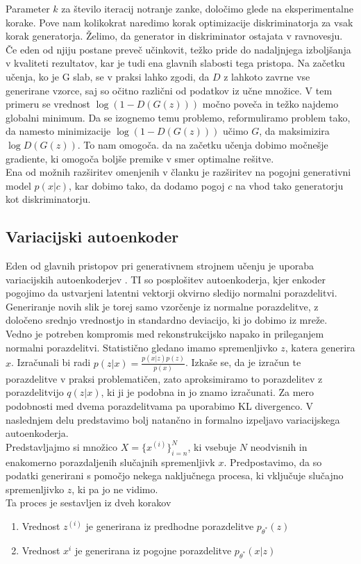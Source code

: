 \documentclass[12pt,a4paper,twoside]{article}
\theoremstyle{definition} %
\theoremstyle{plain} %
\numberwithin{equation}{section}  %
\begin{document}
Parameter $k$ za število iteracij notranje zanke, določimo glede na eksperimentalne korake. Pove nam kolikokrat naredimo korak optimizacije diskriminatorja za vsak korak generatorja. 
Želimo, da generator in diskriminator ostajata v ravnovesju. Če eden od njiju postane preveč učinkovit, težko pride do nadaljnjega izboljšanja v kvaliteti rezultatov, kar je tudi ena glavnih slabosti tega pristopa.  
Na začetku učenja, ko je G slab, se v praksi lahko zgodi, da $D$ z lahkoto zavrne vse generirane vzorce, saj so očitno različni od podatkov iz učne množice. V tem primeru se vrednost $\log(1-D(G(z)))$ močno poveča in težko najdemo globalni minimum. Da se izognemo temu problemo, reformuliramo problem tako, da namesto minimizacije  $\log(1-D(G(z)))$ učimo $G$, da maksimizira $\log{D(G(z))}$. To nam omogoča. da na začetku učenja dobimo močnešje gradiente, ki omogoča boljše premike v smer optimalne rešitve. 
\\
Ena od možnih razširitev omenjenih v članku je razširitev na pogojni generativni model $p(x | c)$, kar  dobimo tako, da dodamo pogoj $c$ na vhod tako generatorju kot diskriminatorju.  

\subsection{Variacijski autoenkoder}
Eden od glavnih pristopov pri generativnem strojnem učenju je uporaba variacijskih autoenkoderjev \cite{kingma2013auto}.  TI so posplošitev autoenkoderja, kjer  enkoder pogojimo da ustvarjeni latentni vektorji okvirno sledijo normalni porazdelitvi. Generiranje novih slik je torej samo vzorčenje iz  normalne porazdelitve,
z določeno srednjo vrednostjo in standardno deviacijo, ki jo dobimo iz mreže. Vedno je potreben kompromis med rekonstrukcijsko napako in prileganjem normalni porazdelitvi. 
Statistično gledano imamo spremenljivko $z$, katera generira $x$. Izračunali bi radi $p(z|x) = \frac{p(x|z)p(z)}{p(x)}$. Izkaše se, da je izračun te porazdelitve v praksi problematičen, zato aproksimiramo to porazdelitev z porazdelitvijo $q(z|x)$, ki ji je podobna in jo znamo izračunati. Za mero podobnosti med dvema porazdelitvama pa uporabimo KL divergenco. 
V naslednjem delu predstavimo bolj natančno in formalno izpeljavo variacijskega autoenkoderja. 
 \\
Predstavljajmo si množico $ X = \{x^{(i)}\}_{i=n}^N$, ki vsebuje $N$ neodvisnih in enakomerno porazdaljenih slučajnih spremenljivk $x$. Predpostavimo, da so podatki generirani s pomočjo nekega naključnega procesa, ki vključuje slučajno spremenljivko $z$, ki pa jo ne vidimo. \\
Ta proces je sestavljen iz dveh korakov 
\begin{enumerate}
\item Vrednost $z^{(i)}$ je generirana iz predhodne porazdelitve $p_{\theta^*}(z)$
\item Vrednost $x^{i}$ je generirana iz pogojne porazdelitve $p_{\theta^*}(x|z)$
\end{enumerate}
\end{document}
